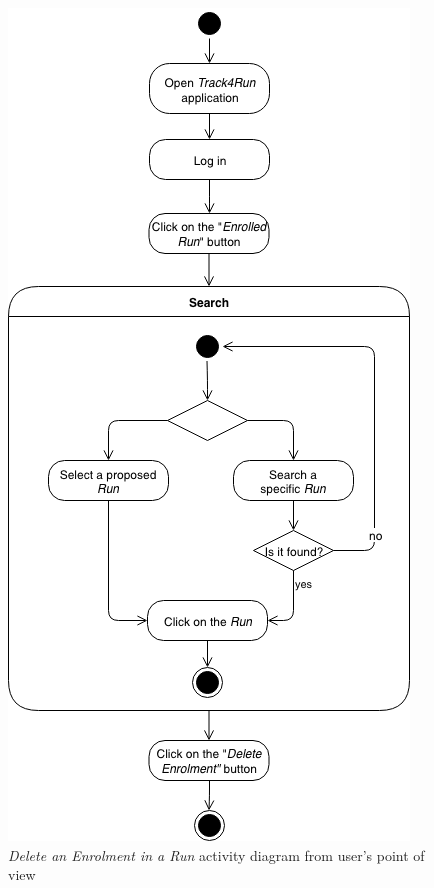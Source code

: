 \begin{figure}[H]
\begin{center}
  \includegraphics[height=0.6\paperheight]{img/activity/DeleteEnrolment.png}
  \hspace{0.05\linewidth}
  \centering
  \caption{\textit{Delete an Enrolment in a Run} activity diagram from user's point of view}
  \label{img:deleteEnrolmentActrivityDiagram}
\end{center}
\end{figure}

